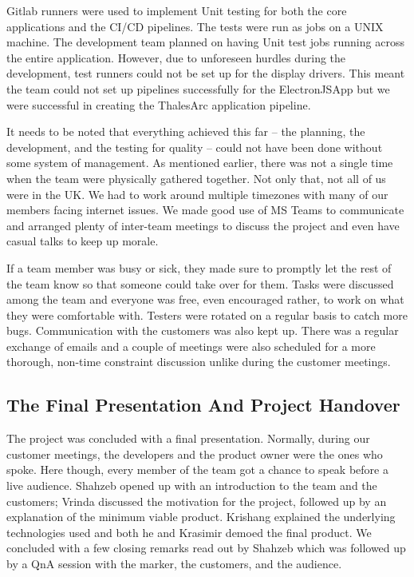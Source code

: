 \documentclass{l3proj}
\begin{document}
Gitlab runners\cite{runner} were used to implement Unit testing for both the core applications and the CI/CD pipelines\cite{pipe}. The tests were run as jobs on a UNIX machine. The development team planned on having Unit test jobs running across the entire application. However, due to unforeseen hurdles during the development, test runners could not be set up for the display drivers. This meant the team could not set up pipelines successfully for the ElectronJSApp but we were successful in creating the ThalesArc application pipeline.

It needs to be noted that everything achieved this far – the planning, the development, and the testing for quality – could not have been done without some system of management\cite{manage}. As mentioned earlier, there was not a single time when the team were physically gathered together. Not only that, not all of us were in the UK. We had to work around multiple timezones with many of our members facing internet issues. We made good use of MS Teams to communicate and arranged plenty of inter-team meetings to discuss the project and even have casual talks to keep up morale.

If a team member was busy or sick, they made sure to promptly let the rest of the team know so that someone could take over for them. Tasks were discussed among the team and everyone was free, even encouraged rather, to work on what they were comfortable with. Testers were rotated on a regular basis to catch more bugs. Communication with the customers was also kept up. There was a regular exchange of emails and a couple of meetings were also scheduled for a more thorough, non-time constraint discussion unlike during the customer meetings.

\subsection{The Final Presentation And Project Handover}
 
The project was concluded with a final presentation. Normally, during our customer meetings, the developers and the product owner were the ones who spoke. Here though, every member of the team got a chance to speak before a live audience. Shahzeb opened up with an introduction to the team and the customers; Vrinda discussed the motivation for the project, followed up by an explanation of the minimum viable product. Krishang explained the underlying technologies used and both he and Krasimir demoed the final product. We concluded with a few closing remarks read out by Shahzeb which was followed up by a QnA session with the marker, the customers, and the audience.
\end{document}

